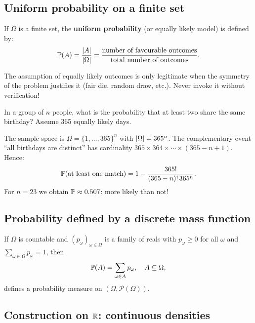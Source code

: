 \subsection{Uniform probability on a finite set}

\begin{definition}
If $\Omega$ is a finite set, the \textbf{uniform probability} (or equally likely
model) is defined by:
\[
    \mathbb{P}(A) = \frac{\left| A \right|}{\left| \Omega \right|}
    = \frac{\text{number of favourable outcomes}}{\text{total number of outcomes}}.
\]
\end{definition}

\begin{intuition}[title=\textbf{When is the uniform model appropriate?}]
The assumption of equally likely outcomes is only legitimate when the symmetry of
the problem justifies it (fair die, random draw, etc.). Never invoke it without
verification!
\end{intuition}

\begin{example}
In a group of $n$ people, what is the probability that at least two share the
same birthday? Assume 365 equally likely days.

The sample space is $\Omega = \{1, \ldots, 365\}^n$ with $\left| \Omega \right| = 365^n$.
The complementary event ``all birthdays are distinct'' has cardinality
$365 \times 364 \times \cdots \times (365 - n + 1)$. Hence:
\[
    \mathbb{P}(\text{at least one match})
    = 1 - \frac{365!}{(365-n)!\, 365^n}.
\]
For $n = 23$ we obtain $\mathbb{P} \approx 0.507$: more likely than not!
\end{example}

\subsection{Probability defined by a discrete mass function}

\begin{proposition}
If $\Omega$ is countable and $(p_\omega)_{\omega \in \Omega}$ is a family of reals
with $p_\omega \geq 0$ for all $\omega$ and $\sum_{\omega \in \Omega} p_\omega = 1$,
then
\[
    \mathbb{P}(A) = \sum_{\omega \in A} p_\omega, \quad A \subseteq \Omega,
\]
defines a probability measure on $(\Omega, \mathcal{P}(\Omega))$.
\end{proposition}

\subsection{Construction on $\mathbb{R}$: continuous densities}

